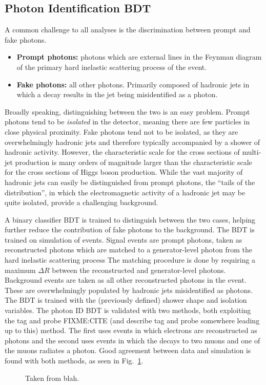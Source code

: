 \subsection{Photon Identification BDT} \label{sec:evt_photon_idmva}
A common challenge to all \Hgg analyses is the discrimination between prompt and fake photons.
\begin{itemize}
    \item \textbf{Prompt photons:} photons which are external lines in the Feynman diagram of the primary hard inelastic scattering process of the event.
    \item \textbf{Fake photons:} all other photons. Primarily composed of hadronic jets in which a \Pigg decay results in the jet being misidentified as a photon.
\end{itemize}
Broadly speaking, distinguishing between the two is an easy problem.
Prompt photons tend to be \emph{isolated} in the detector, meaning there are few particles in close physical proximity.
Fake photons tend not to be isolated, as they are overwhelmingly hadronic jets and therefore typically accompanied by a shower of hadronic activity.
However, the characteristic scale for the cross sections of multi-jet production is many orders of magnitude larger than the characteristic scale for the cross sections of Higgs boson production.
While the vast majority of hadronic jets can easily be distinguished from prompt photons, the ``tails of the distribution'', in which the electromagnetic activity of a hadronic jet may be quite isolated, provide a challenging background.

A binary classifier BDT is trained to distinguish between the two cases, helping further reduce the contribution of fake photons to the background.
The BDT is trained on simulation of \gjets events.
Signal events are prompt photons, taken as reconstructed photons which are matched to a generator-level photon from the hard inelastic scattering process
The matching procedure is done by requiring a maximum $\Delta R$ between the reconstructed and generator-level photons.
Background events are taken as all other reconstructed photons in the event.
These are overwhelmingly populated by hadronic jets misidentified as photons.
The BDT is trained with the (previously defined) shower shape and isolation variables.
The photon ID BDT is validated with two methods, both exploiting the tag and probe FIXME:CITE (and describe tag and probe somewhere leading up to this) method.
The first uses \Zee events in which electrons are reconstructed as photons and the second uses \Zuug events in which the \PZ decays to two muons and one of the muons radiates a photon.
Good agreement between data and simulation is found with both methods, as seen in Fig.~\ref{fig:photon_idmva}.
\begin{figure} [h!]
    \centering
    \caption{Taken from blah.}
    \label{fig:photon_idmva}
\end{figure}

